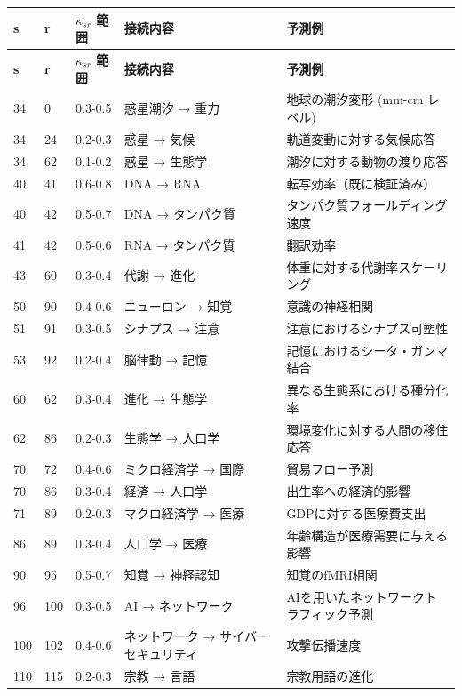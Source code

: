 \documentclass[13pt,a4paper]{ltjsarticle}
\begin{document}
	\begin{longtable}{|p{1cm}|p{1cm}|p{2.5cm}|p{4cm}|p{3cm}|}
		\hline
		\textbf{s} & \textbf{r} & \textbf{$\kappa_{sr}$ 範囲} & \textbf{接続内容} & \textbf{予測例} \\
		\hline
		\endfirsthead
		\hline
		\textbf{s} & \textbf{r} & \textbf{$\kappa_{sr}$ 範囲} & \textbf{接続内容} & \textbf{予測例} \\
		\hline
		\endhead
		
		34 & 0 & 0.3-0.5 & 惑星潮汐 → 重力 & 地球の潮汐変形 (mm-cm レベル) \\
		34 & 24 & 0.2-0.3 & 惑星 → 気候 & 軌道変動に対する気候応答 \\
		34 & 62 & 0.1-0.2 & 惑星 → 生態学 & 潮汐に対する動物の渡り応答 \\
		40 & 41 & 0.6-0.8 & DNA → RNA & 転写効率（既に検証済み） \\
		40 & 42 & 0.5-0.7 & DNA → タンパク質 & タンパク質フォールディング速度 \\
		41 & 42 & 0.5-0.6 & RNA → タンパク質 & 翻訳効率 \\
		43 & 60 & 0.3-0.4 & 代謝 → 進化 & 体重に対する代謝率スケーリング \\
		50 & 90 & 0.4-0.6 & ニューロン → 知覚 & 意識の神経相関 \\
		51 & 91 & 0.3-0.5 & シナプス → 注意 & 注意におけるシナプス可塑性 \\
		53 & 92 & 0.2-0.4 & 脳律動 → 記憶 & 記憶におけるシータ・ガンマ結合 \\
		60 & 62 & 0.3-0.4 & 進化 → 生態学 & 異なる生態系における種分化率 \\
		62 & 86 & 0.2-0.3 & 生態学 → 人口学 & 環境変化に対する人間の移住応答 \\
		70 & 72 & 0.4-0.6 & ミクロ経済学 → 国際 & 貿易フロー予測 \\
		70 & 86 & 0.3-0.4 & 経済 → 人口学 & 出生率への経済的影響 \\
		71 & 89 & 0.2-0.3 & マクロ経済学 → 医療 & GDPに対する医療費支出 \\
		86 & 89 & 0.3-0.4 & 人口学 → 医療 & 年齢構造が医療需要に与える影響 \\
		90 & 95 & 0.5-0.7 & 知覚 → 神経認知 & 知覚のfMRI相関 \\
		96 & 100 & 0.3-0.5 & AI → ネットワーク & AIを用いたネットワークトラフィック予測 \\
		100 & 102 & 0.4-0.6 & ネットワーク → サイバーセキュリティ & 攻撃伝播速度 \\
		110 & 115 & 0.2-0.3 & 宗教 → 言語 & 宗教用語の進化 \\
		\hline
	\end{longtable}
	
\end{document}
